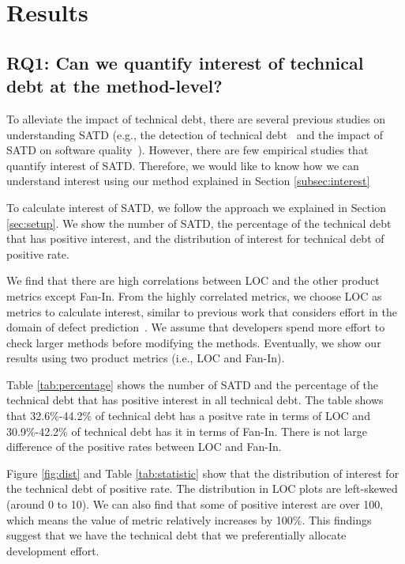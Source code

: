 \section{Results} \label{sec:results}
\subsection{RQ1: Can we quantify interest of technical debt at the method-level?}
To alleviate the impact of technical debt, there are several previous studies on understanding SATD (e.g., the detection of technical debt~\cite{Potdar2014ICSME,Zazworka2013EASE} and the impact of SATD on software quality~\cite{Wehaibi2016SANER}).
However, there are few empirical studies that quantify interest of SATD.
Therefore, we would like to know how we can understand interest using our method explained in Section \ref{subsec:interest}

To calculate interest of SATD, we follow the approach we explained in Section \ref{sec:setup}.
We show the number of SATD, the percentage of the technical debt that has positive interest, and the distribution of interest for technical debt of positive rate.

We find that there are high correlations between LOC and the other product metrics except Fan-In. 
From the highly correlated metrics, we choose LOC as metrics to calculate interest, similar to previous work that considers effort in the domain of defect prediction~\cite{Kamei2010ICSM,Kamei2013TSE}. We assume that developers spend more effort to check larger methods before modifying the methods. Eventually, we show our results using two product metrics (i.e., LOC and Fan-In).

Table \ref{tab:percentage} shows the number of SATD and the percentage of the technical debt that has positive interest in all technical debt. The table shows that 32.6\%-44.2\% of technical debt has a positve rate in terms of LOC and 30.9\%-42.2\% of technical debt has it in terms of Fan-In. 
There is not large difference of the positive rates between LOC and Fan-In. 

Figure \ref{fig:dist} and Table \ref{tab:statistic} show that the distribution of interest for the technical debt of positive rate. The distribution in LOC plots are left-skewed (around 0 to 10). We can also find that some of positive interest are over 100, which means the value of metric relatively increases by 100\%.
This findings suggest that we have the technical debt that we preferentially allocate development effort.

